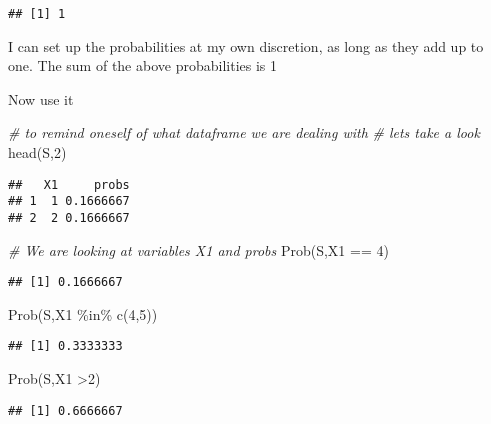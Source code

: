 \documentclass[
]{article}
\newenvironment{Shaded}{\begin{snugshade}}{\end{snugshade}}
\newcommand{\CommentTok}[1]{\textcolor[rgb]{0.56,0.35,0.01}{\textit{#1}}}
\newcommand{\DecValTok}[1]{\textcolor[rgb]{0.00,0.00,0.81}{#1}}
\newcommand{\FunctionTok}[1]{\textcolor[rgb]{0.00,0.00,0.00}{#1}}
\newcommand{\NormalTok}[1]{#1}
\newcommand{\SpecialCharTok}[1]{\textcolor[rgb]{0.00,0.00,0.00}{#1}}
\begin{document}
\begin{verbatim}
## [1] 1
\end{verbatim}

I can set up the probabilities at my own discretion, as long as they add
up to one. The sum of the above probabilities is 1

Now use it

\begin{Shaded}
\begin{Highlighting}[]
\CommentTok{\# to remind oneself of what dataframe we are dealing with}
\CommentTok{\# lets take a look}
\FunctionTok{head}\NormalTok{(S,}\DecValTok{2}\NormalTok{)}
\end{Highlighting}
\end{Shaded}

\begin{verbatim}
##   X1     probs
## 1  1 0.1666667
## 2  2 0.1666667
\end{verbatim}

\begin{Shaded}
\begin{Highlighting}[]
\CommentTok{\# We are looking at variables X1 and probs}
\FunctionTok{Prob}\NormalTok{(S,X1 }\SpecialCharTok{==} \DecValTok{4}\NormalTok{)}
\end{Highlighting}
\end{Shaded}

\begin{verbatim}
## [1] 0.1666667
\end{verbatim}

\begin{Shaded}
\begin{Highlighting}[]
\FunctionTok{Prob}\NormalTok{(S,X1 }\SpecialCharTok{\%in\%} \FunctionTok{c}\NormalTok{(}\DecValTok{4}\NormalTok{,}\DecValTok{5}\NormalTok{))}
\end{Highlighting}
\end{Shaded}

\begin{verbatim}
## [1] 0.3333333
\end{verbatim}

\begin{Shaded}
\begin{Highlighting}[]
\FunctionTok{Prob}\NormalTok{(S,X1 }\SpecialCharTok{\textgreater{}}\DecValTok{2}\NormalTok{)}
\end{Highlighting}
\end{Shaded}

\begin{verbatim}
## [1] 0.6666667
\end{verbatim}
\end{document}
